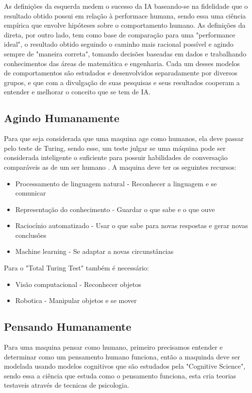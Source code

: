 \documentclass[
	12pt,				%
	openright,			%
	oneside,			%
	a4paper,			%
	english,			%
	spanish,			%
	brazil				%
	]{abntex2}
\begin{document}
	As definições da esquerda medem o sucesso da IA baseando-se na fidelidade que o resultado obtido possui em relação à performace humana, sendo essa uma ciência empírica que envolve hipóteses sobre o comportamento humano. As definições da direta, por outro lado, tem como base de comparação para uma "performance ideal", o resultado obtido seguindo o caminho mais racional possível e agindo sempre de "maneira correta", tomando decisões baseadas em dados e trabalhando conhecimentos das áreas de matemática e engenharia. Cada um desses modelos de comportamentos são estudados e desenvolvidos separadamente por diversos grupos, e que com a divulgação de suas pesquisas e seus resultados cooperam a entender e melhorar o conceito que se tem de IA. \citeauthor{norvig}
	 
	\subsection*{Agindo Humanamente}
		Para que seja considerada que uma maquina age como humanos, ela deve passar pelo teste de Turing, sendo esse, um teste julgar se uma máquina pode ser considerada inteligente o suficiente para possuir habilidades de conversação comparáveis as de um ser humano \cite{turing}. A maquina deve ter os seguintes recursos:
		
		\begin{itemize}
  			\item Processamento de linguagem natural - Reconhecer a linguagem e se comunicar
  			\item Representação do conhecimento - Guardar o que sabe e o que ouve
  			\item Raciocínio automatizado - Usar o que sabe para novas respostas e gerar novas conclusões
  			\item Machine learning - Se adaptar a novas circunstâncias
  		\end{itemize}
  			
  			Para o "Total Turing Test" também é necessário:
  			
  		\begin{itemize}
  			\item Visão computacional - Reconhecer objetos
  			\item Robotica - Manipular objetos e se mover
		\end{itemize}
		
	\subsection*{Pensando Humanamente}
		Para uma maquina pensar como humano, primeiro precisamos entender e determinar como um pensamento humano funciona, então a maquinda deve ser modelada usando modelos cognitivos que são estudados pela "Cognitive Science", sendo essa a ciência que estuda como o pensamento funciona, esta cria teorias testaveis através de tecnicas de psicologia. \cite{wilson_keil}
		
\end{document}
